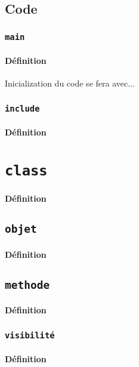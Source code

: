 \documentclass{article}
\begin{document}
\subsection{Code}
\subsubsection{\texttt{main}}
\paragraph{Définition}Inicialization du code se fera avec...
\begin{scriptsize}
    \myStyleCPP
    
\end{scriptsize}

\subsubsection{\texttt{include}}
\paragraph{Définition}


\newpage\section{\texttt{class}}
\paragraph{Définition}

\subsection{\texttt{objet}}
\paragraph{Définition}

\subsection{\texttt{methode}}
\paragraph{Définition}

\subsubsection{\texttt{visibilité}}
\paragraph{Définition}
\end{document}
